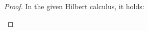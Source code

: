         \begin{proof}
            In the given Hilbert calculus, it holds:
            \footnotesize
            \begin{sequentdeduction}
            \end{sequentdeduction}
        \end{proof}

        
